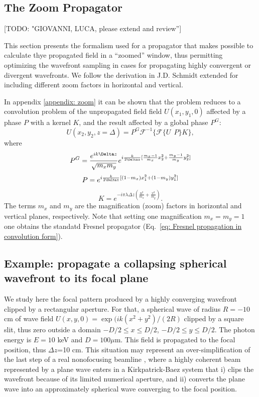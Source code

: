 \documentclass{iucr}              %
\newcommand{\todo}[1]{{\color{red}[TODO: "#1'']}}
\begin{document}
\subsection{The Zoom Propagator}
\label{subch: zoom}

\todo{GIOVANNI, LUCA, please extend and review}

This section presents the formalism used for a propagator that makes possible to calculate thye propagated field in a ``zoomed'' window, thus permitting optimizing the wavefront sampling in cases for propagating highly convergent or divergent wavefronts. We follow the derivation in J.D. Schmidt \cite{schmidt} extended for including different zoom factors in horizontal and vertical. 

In appendix \ref{appendix: zoom} it can be shown that the problem reduces to a convolution problem of the unpropagated field field $U(x_1,y_1,0)$ affected by a phase $P$ with a kernel $K$, and the result affected by a global phase $P^G$: 
\begin{equation}
U(x_2, y_2, z=\Delta) = P^G \mathcal{F}^{-1} \Big\{ \mathcal{F} \big\{ U~~P \big\} K \Big\},
\end{equation}
where
\begin{equation}
P^G =  \frac { e^{ik\Delta z }}{\sqrt{m_x m_y} }e^{i \frac{k}{2 \Delta z} [\frac{m_x - 1}{m_x}x_2^2 + \frac{m_y - 1}{m_y}y_2^2]}  \\
\end{equation}
\begin{equation}
P = e^{i \frac{k}{2 \Delta z} [(1-m_x)x_1^2 + (1-m_y)y_1^2]} \\
\end{equation}
\begin{equation}
K = e^{-i \pi \lambda \Delta z (\frac{u^2}{m_x} +\frac{v^2}{m_y})}.
\end{equation}
The terms $m_x$ and $m_y$ are the magnification (zoom) factors in horizontal and vertical planes, respectively. 
Note that setting one magnification $m_x=m_y=1$ one obtains the standatd Fresnel propagator (Eq.~\ref{eq: Fresnel propagation in convolution form}).


\subsection{Example: propagate a collapsing spherical wavefront to its focal plane}
\label{subch: aperture converging}

We study here the focal pattern produced by a highly converging wavefront clipped by a rectangular aperture. For that, a spherical wave of radius $R=-10$ cm of wave field $U(x,y,0) = \exp(i k (x^2 + y^2) / (2 R)$ clipped by a square slit, thus  zero outside a domain $-D/2\le x\le D/2$, $-D/2\le y\le D/2$. The photon energy is $E=10$ keV and $D=100 \mu$m. 
This field is propagated to the focal position, thus $\Delta z$=10 cm. This situation may represent an over-simplification of the last step of a real nonofocusing beamline \cite{ID16A}, where a highly coherent beam represented by a plane wave enters in a  Kirkpatrick-Baez system that i) clips the wavefront because of its limited numerical aperture, and ii) converts the plane wave into an approximately spherical wave converging to the focal position.
\end{document}

